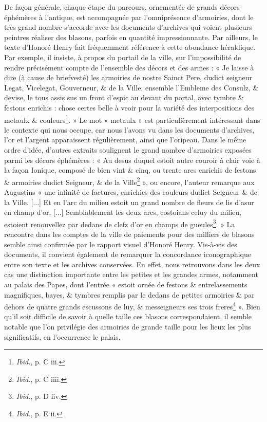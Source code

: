 \documentclass[12pt,twoside,openany]{book}
\begin{document}
De façon générale, chaque étape du parcours, ornementée de grands décors éphémères à l’antique, est accompagnée par l’omniprésence d’armoiries, dont le très grand nombre s’accorde avec les documents d’archives qui voient plusieurs peintres réaliser des blasons, parfois en quantité impressionnante. Par ailleurs, le texte d’Honoré Henry fait fréquemment référence à cette abondance héraldique. Par exemple, il insiste, à propos du portail de la ville, sur l’impossibilité de rendre précisément compte de l’ensemble des décors et des armes : « Je laisse à dire (à cause de briefvesté) les armoiries de nostre Sainct Pere, dudict seigneur Legat, Vicelegat, Gouverneur, \& de la Ville, ensemble l’Embleme des Consulz, \& devise, le tous assis sus un front d’espic au devant du portal, avec tymbre \& festons enrichis : chose certes belle à veoir pour la variété des interpositions des metaulx \& couleurs\footnote{\textit{Ibid.}, p. C iii.}. » Le mot « metaulx » est particulièrement intéressant dans le contexte qui nous occupe, car nous l’avons vu dans les documents d’archives, l’or et l’argent apparaissent régulièrement, ainsi que l’oripeau. Dans le même ordre d’idée, d’autres extraits soulignent le grand nombre d’armoiries exposées parmi les décors éphémères : « Au desus duquel estoit autre couroir à clair voie à la façon Ionique, composé de bien vint \& cinq, ou trente arcs enrichis de festons \& armoiries dudict Seigneur, \& de la Ville\footnote{\textit{Ibid.}, p. C iiii.} », ou encore, l’auteur remarque aux Augustins « une infinité de factures, enrichies des couleurs dudict Seigneur \& de la Ville. [...] Et en l’arc du milieu estoit un grand nombre de fleurs de lis d’asur en champ d’or. [...] Semblablement les deux arcs, costoians celuy du milieu, estoient renouvellez par dedans de clefz d’or en champs de gueules\footnote{\textit{Ibid.}, p. D iiv.}. » La rencontre dans les comptes de la ville de paiements pour des milliers de blasons semble ainsi confirmée par le rapport visuel d’Honoré Henry. Vis-à-vis des documents, il convient également de remarquer la concordance iconographique entre son texte et les archives conservées. En effet, nous retrouvons dans les deux cas une distinction importante entre les petites et les grandes armes, notamment au palais des Papes, dont l’entrée « estoit ornée de festons \& entrelassements magnifiques, bayes, \& tymbres remplis par le dedans de petites armoiries \& par dehors de quatre grands escussons de luy, \& messeigneurs ses trois freres\footnote{\textit{Ibid.}, p. E ii.} ». Bien qu’il soit difficile de savoir à quelle taille ces blasons correspondaient, il semble notable que l’on privilégie des armoiries de grande taille pour les lieux les plus significatifs, en l’occurrence le palais.
\end{document}
